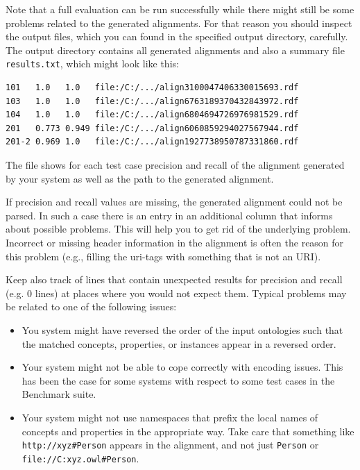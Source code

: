 \documentclass{article}
\begin{document}
Note that a full evaluation can be run successfully while there might still be some problems related to the generated alignments. 
For that reason you should inspect the output files, which you can found in the specified output directory, carefully. 
The output directory contains all generated alignments and also a summary file \verb|results.txt|, which might look like this:
\begin{verbatim}
101   1.0   1.0   file:/C:/.../align3100047406330015693.rdf
103   1.0   1.0   file:/C:/.../align6763189370432843972.rdf
104   1.0   1.0   file:/C:/.../align6804694726976981529.rdf
201   0.773 0.949 file:/C:/.../align6060859294027567944.rdf
201-2 0.969 1.0   file:/C:/.../align1927738950787331860.rdf
\end{verbatim}
The file shows for each test case precision and recall of the alignment generated by your system as well as the path to the generated alignment.

If precision and recall values are missing, the generated alignment could not be parsed. In such a case there is an entry in an additional column that informs about possible problems. This will help you to get rid of the underlying problem. Incorrect or missing header information in the alignment is often the reason for this problem (e.g., filling the uri-tags with something that is not an URI).

Keep also track of lines that contain unexpected results for precision and recall (e.g. 0 lines) at places where you would not expect them. Typical problems may be related to one of the following issues:
\begin{itemize}
	\item You system might have reversed the order of the input ontologies such that the matched concepts, properties, or instances appear in a reversed order.
	\item Your system might not be able to cope correctly with encoding issues. This has been the case for some systems with respect to some test cases in the Benchmark suite.
	\item Your system might not use namespaces that prefix the local names of concepts and properties in the appropriate way. Take care that something like \verb|http://xyz#Person| appears in the alignment, and not just \verb|Person| or  \verb|file://C:xyz.owl#Person|.
\end{itemize}

%
\end{document}
